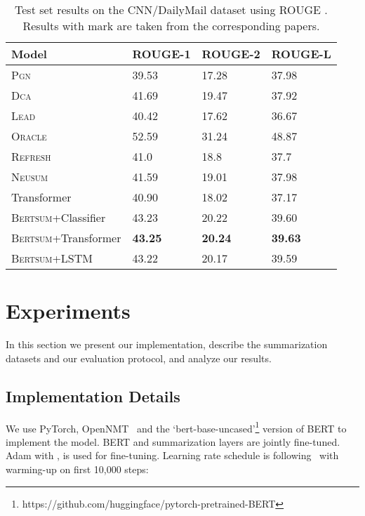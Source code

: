 \documentclass[11pt,a4paper]{article}
\begin{document}
    
                \begin{table*}[htbp]
    \center
    \begin{tabular}{l|lll}
        Model              & ROUGE-1    & ROUGE-2    & ROUGE-L    \\ \hline
        \textsc{Pgn}  &39.53&17.28&37.98\\

        \textsc{Dca}  &41.69&19.47&37.92\\\hline
        \textsc{Lead}               & 40.42  & 17.62  & 36.67  \\
                \textsc{Oracle}               & 52.59  & 31.24 & 48.87  \\
        \textsc{Refresh}              & 41.0  & 18.8 & 37.7  \\
        \textsc{Neusum}              & 41.59  & 19.01  & 37.98  \\\hline

        Transformer& 40.90 & 18.02  & 37.17  \\
        \textsc{Bertsum}+Classifier  & 43.23  & 20.22 & 39.60\\
        \textsc{Bertsum}+Transformer  & \textbf{43.25}& \textbf{20.24}& \textbf{39.63}\\
        \textsc{Bertsum}+LSTM  & 43.22  & 20.17 & 39.59
    \end{tabular}
    \caption{Test set results on  the CNN/DailyMail  dataset using  ROUGE . Results with  mark
        are taken from the corresponding papers.}
\end{table*}

    \section{Experiments}
    In this section we present our  implementation, describe the
    summarization datasets and  our evaluation protocol, and analyze our results.
    
    
    \subsection{Implementation Details} 
    
    We use PyTorch, OpenNMT~\cite{klein2017opennmt} and the `bert-base-uncased'\footnote{https://github.com/huggingface/pytorch-pretrained-BERT} version of BERT to implement the model. 
    BERT and summarization layers are jointly fine-tuned.
    Adam with  ,  is used for fine-tuning. Learning rate schedule is following~\cite{vaswani2017attention} with warming-up on first 10,000 steps:
    
\end{document}
